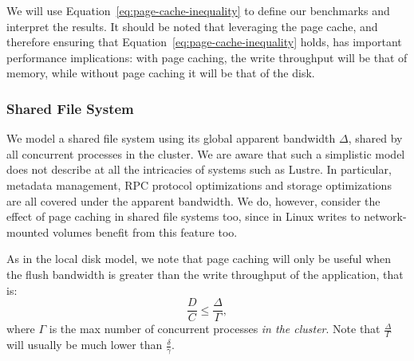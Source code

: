 \documentclass{IEEEtran}
\newcommand{\todo}[1]{\marginpar{\parbox{18mm}{\flushleft\tiny\color{red}\textbf{TODO}:
      #1}}}
\begin{document}
 We will use Equation~\ref{eq:page-cache-inequality} to 
define our benchmarks and interpret the results. It 
should be noted that leveraging the page cache, and therefore ensuring 
that Equation~\ref{eq:page-cache-inequality} holds, has important 
performance implications: with page caching, the write throughput will 
be that of memory, while without page caching it will be that of the 
disk.


\subsubsection{Shared File System}

We model a shared file system using its global apparent bandwidth 
$\Delta$, shared by all concurrent processes in the cluster. We are 
aware that such a simplistic model does not describe at all the 
intricacies of systems such as Lustre. In particular, metadata 
management, RPC protocol optimizations and storage optimizations are 
all covered under the apparent bandwidth. We do, however, consider the 
effect of page caching in shared file systems too, since in Linux 
writes to network-mounted volumes benefit from this feature too.

As in the local disk model, we note that page caching will only be 
useful when the flush bandwidth is greater than the write throughput of 
the application, that is:
\begin{equation}
\frac{D}{C} \leq \frac{\Delta}{\Gamma}, \label{eq:page-cache-sharedfs}
\end{equation}
where $\Gamma$ is the max number of concurrent processes \emph{in the cluster}. 
Note that $\frac{\Delta}{\Gamma}$ will usually be much lower than 
$\frac{\delta}{\gamma}$.     





\end{document}
